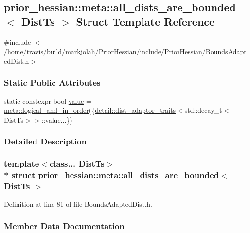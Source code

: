 \hypertarget{structprior__hessian_1_1meta_1_1all__dists__are__bounded}{}\subsection{prior\+\_\+hessian\+:\+:meta\+:\+:all\+\_\+dists\+\_\+are\+\_\+bounded$<$ Dist\+Ts $>$ Struct Template Reference}
\label{structprior__hessian_1_1meta_1_1all__dists__are__bounded}


{\ttfamily \#include $<$/home/travis/build/markjolah/\+Prior\+Hessian/include/\+Prior\+Hessian/\+Bounds\+Adapted\+Dist.\+h$>$}

\subsubsection*{Static Public Attributes}
\begin{DoxyCompactItemize}
\item 
static constexpr bool \hyperlink{structprior__hessian_1_1meta_1_1all__dists__are__bounded_a2fc2479323836d75b65614a3ee2b640f}{value} = \hyperlink{namespaceprior__hessian_1_1meta_add11951e7edc2c231ca52c32ac0ee07b}{meta\+::logical\+\_\+and\+\_\+in\+\_\+order}(\{\hyperlink{classprior__hessian_1_1detail_1_1dist__adaptor__traits}{detail\+::dist\+\_\+adaptor\+\_\+traits}$<$std\+::decay\+\_\+t$<$Dist\+Ts$>$$>$\+::value...\})
\end{DoxyCompactItemize}


\subsubsection{Detailed Description}
\subsubsection*{template$<$class... Dist\+Ts$>$\\*
struct prior\+\_\+hessian\+::meta\+::all\+\_\+dists\+\_\+are\+\_\+bounded$<$ Dist\+Ts $>$}



Definition at line 81 of file Bounds\+Adapted\+Dist.\+h.



\subsubsection{Member Data Documentation}
